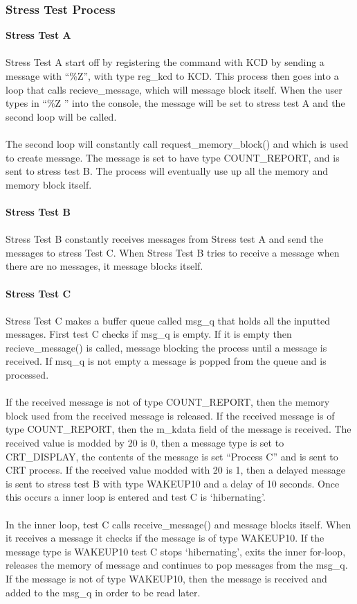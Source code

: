 \documentclass[12pt]{article}
\begin{document}
\subsubsection{Stress Test Process}
\textbf{Stress Test A}\\ \\
Stress Test A start off by registering the command with KCD by sending a message with “\%Z”, with type reg\_kcd to KCD. This process then goes into a loop that calls recieve\_message, which will message block itself. When the user types in “\%Z ” into the console, the message will be set to stress test A and the second loop will be called.\\ \\
The second loop will constantly call request\_memory\_block() and which is used to create message. The message is set to have type COUNT\_REPORT, and is sent to stress test B. The process will eventually use up all the memory and memory block itself.\\ \\
\textbf{Stress Test B}\\ \\ 
Stress Test B constantly receives messages from Stress test A and send the messages to stress Test C. When Stress Test B tries to receive a message when there are no messages, it message blocks itself. \\ \\
\textbf{Stress Test C}\\ \\ 
Stress Test C makes a buffer queue called msg\_q that holds all the inputted messages. First test C checks if msg\_q is empty. If it is empty then recieve\_message() is called, message blocking the process until a message is received. If msq\_q is not empty a message is popped from the queue and is processed. \\ \\
If the received message is not of type COUNT\_REPORT, then the memory block used from the received message is released.  If the received message is of type COUNT\_REPORT, then the m\_kdata field of the message is received. The received value is modded by 20 is 0, then a message type is set to CRT\_DISPLAY, the contents of the message is set “Process C” and is sent to CRT process. If the received value modded with 20 is 1, then a delayed message is sent to stress test B with type WAKEUP10 and a delay of 10 seconds. Once this occurs a inner loop is entered and test C is ‘hibernating’. \\ \\
In the inner loop, test C calls receive\_message() and message blocks itself. When it receives a message it checks if the message is of type WAKEUP10. If the message type is WAKEUP10 test C stops ‘hibernating’, exits the inner for-loop, releases the memory of message and continues to pop messages from the msg\_q. If the message is not of type WAKEUP10, then the message is received and added to the msg\_q in order to be read later. 
\newpage
\end{document}
